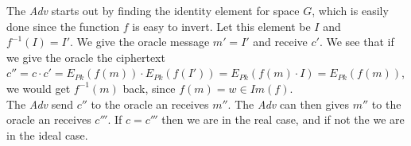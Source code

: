 \documentclass[paper=a4, fontsize=11pt]{scrartcl} %
\numberwithin{equation}{section} %
\numberwithin{figure}{section} %
\numberwithin{table}{section} %
\begin{document}
	The \textit{Adv} starts out by finding the identity element for space $G$, which is easily done since the function $f$ is easy to invert. Let this element be $I$ and $f^{-1}(I)=I'$. We give the oracle message $m'=I'$ and receive $c'$. We see that if we give the oracle the ciphertext $c''=c\cdot c'=E_{Pk}(f(m))\cdot E_{Pk}(f(I'))=E_{Pk}(f(m)\cdot I)=E_{Pk}(f(m))$, we would get $f^{-1}(m)$ back, since $f(m)=w\in Im(f)$. \\
	
	The \textit{Adv} send $c''$ to the oracle an receives $m''$. The \textit{Adv} can then gives $m''$ to the oracle an receives $c'''$. If $c=c'''$ then we are in the real case, and if not the we are in the ideal case.
\end{document}
